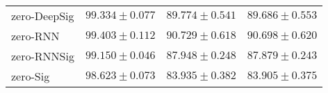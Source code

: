 \begin{tabular}{llll}
\midrule
zero-DeepSig   &                           $ 99.334 \pm 0.077 $ &                           $ 89.774 \pm 0.541 $ &                           $ 89.686 \pm 0.553 $ \\
zero-RNN       &                           $ 99.403 \pm 0.112 $ &                           $ 90.729 \pm 0.618 $ &                           $ 90.698 \pm 0.620 $ \\
zero-RNNSig    &                           $ 99.150 \pm 0.046 $ &                           $ 87.948 \pm 0.248 $ &                           $ 87.879 \pm 0.243 $ \\
zero-Sig       &                           $ 98.623 \pm 0.073 $ &                           $ 83.935 \pm 0.382 $ &                           $ 83.905 \pm 0.375 $ \\
\bottomrule
\end{tabular}

